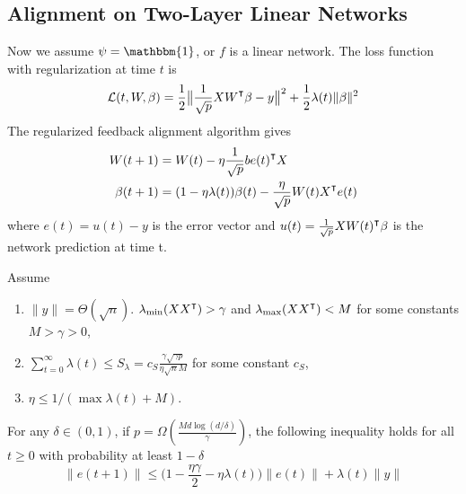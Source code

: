 \subsection{Alignment on Two-Layer Linear Networks}

Now we assume $\psi = \mathbbm{1}$, or $f$ is a linear network. The loss function with regularization at time $t$ is 
\begin{equation}
\label{eq:reg_loss}
\Loss(t, W, \beta) = \frac{1}{2}\big\|\frac{1}{\sqrt p}XW\transpose\beta-y\big\|^2 + \frac{1}{2}\lambda(t)\|\beta\|^2
\end{equation}
The regularized feedback alignment algorithm gives
\begin{equation}
\label{eq:reg_alg}
\begin{aligned}
    W(t+1) &= W(t) - \eta\frac{1}{\sqrt p}b e(t)\transpose X\\
    \beta(t+1) &= (1-\eta\lambda(t))\beta(t)- \frac{\eta}{\sqrt p} W(t)X\transpose e(t)
\end{aligned}
\end{equation}
where $e(t)=u(t)-y$ is the error vector and $u(t) = \frac{1}{\sqrt p}XW(t)\transpose \beta$ is the network prediction at time t.


\begin{theorem}
\label{thm:lin_conv}
Assume
\begin{enumerate}
\item $\|y\| = \Theta(\sqrt n)$. $\lambda_{\min}(XX\transpose)>\gamma$ and $\lambda_{\max}(XX\transpose)<M$ for some constants $M>\gamma>0$,
\item $\sum_{t=0}^\infty \lambda(t) \leq  S_\lambda = c_{S}\frac{\gamma\sqrt{\gamma p}}{\eta\sqrt{n}M}$ for some constant $c_{S}$,
\item $\eta \leq 1/(\max \lambda(t)+M)$.
\end{enumerate}
For any $\delta\in(0,1)$, if $p = \Omega(\frac{Md\log(d/\delta)}{\gamma})$, the following inequality holds for all $t\geq 0$ with probability at least $1-\delta$
\begin{equation}
\label{eq:reg_error_bd}
\|e(t+1)\|\leq \big(1-\frac{\eta\gamma}{2}-\eta\lambda(t)\big)\|e(t)\| + \lambda(t)\|y\|
\end{equation} 
\end{theorem}

